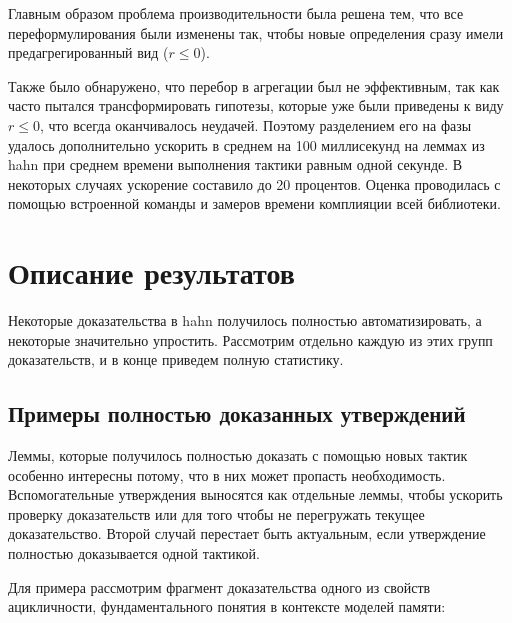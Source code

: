 \documentclass[times
              ,specification
              ,annotation
              ]{itmo-student-thesis}
\begin{document}
      Главным образом проблема производительности была решена тем, что все переформулирования были
      изменены так, чтобы новые определения сразу имели предагрегированный вид ($r \leq 0$).

      Также было обнаружено, что перебор в агрегации был не эффективным, так как часто пытался
      трансформировать гипотезы, которые уже были приведены к виду $r \le 0$, что всегда оканчивалось
      неудачей. Поэтому разделением его на фазы удалось дополнительно ускорить  в
      среднем на 100 миллисекунд на леммах из hahn при среднем времени выполнения тактики равным
      одной секунде.
      В некоторых случаях ускорение составило до 20 процентов. Оценка проводилась с помощью
      встроенной команды  и замеров времени комплияции всей библиотеки. 

  \section{Описание результатов}

  
    Некоторые доказательства в hahn получилось полностью автоматизировать, а некоторые значительно
    упростить. Рассмотрим отдельно каждую из этих групп доказательств, и в конце приведем полную
    статистику.

    \subsection{Примеры полностью доказанных утверждений}

      Леммы, которые получилось полностью доказать с помощью новых тактик особенно интересны
      потому, что в них может пропасть необходимость.
      Вспомогательные утверждения выносятся как отдельные леммы, чтобы ускорить проверку доказательств
      или для того чтобы не перегружать текущее доказательство.
      Второй случай перестает быть актуальным, если утверждение полностью доказывается одной тактикой.
      
      Для примера рассмотрим фрагмент доказательства одного из свойств ацикличности, фундаментального
      понятия в контексте моделей памяти:
\end{document}
